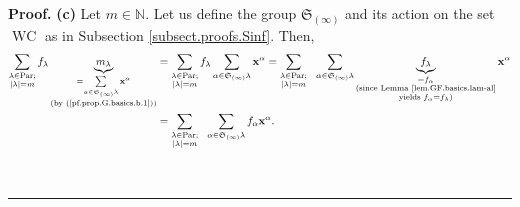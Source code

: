 \documentclass[numbers=enddot,12pt,final,onecolumn,notitlepage]{scrartcl}%
\theoremstyle{definition}
\newenvironment{proof}[1][Proof]{\noindent\textbf{#1.} }{\ \rule{0.5em}{0.5em}}
\let\sumnonlimits\sum
\renewcommand{\sum}{\sumnonlimits\limits}
\newenvironment{verlong}{}{}
\begin{document}
\begin{verlong}
\begin{proof}
\textbf{(c)} Let $m\in\mathbb{N}$. Let us define the group $\mathfrak{S}%
_{\left(  \infty\right)  }$ and its action on the set $\operatorname*{WC}$ as
in Subsection \ref{subsect.proofs.Sinf}. Then,%
\begin{align}
\sum_{\substack{\lambda\in\operatorname*{Par};\\\left\vert \lambda\right\vert
=m}}f_{\lambda}\underbrace{m_{\lambda}}_{\substack{=\sum_{\alpha
\in\mathfrak{S}_{\left(  \infty\right)  }\lambda}\mathbf{x}^{\alpha
}\\\text{(by (\ref{pf.prop.G.basics.b.1}))}}}  &  =\sum_{\substack{\lambda
\in\operatorname*{Par};\\\left\vert \lambda\right\vert =m}}f_{\lambda}%
\sum_{\alpha\in\mathfrak{S}_{\left(  \infty\right)  }\lambda}\mathbf{x}%
^{\alpha}=\sum_{\substack{\lambda\in\operatorname*{Par};\\\left\vert
\lambda\right\vert =m}}\ \ \sum_{\alpha\in\mathfrak{S}_{\left(  \infty\right)
}\lambda}\underbrace{f_{\lambda}}_{\substack{=f_{\alpha}\\\text{(since Lemma
\ref{lem.GF.basics.lam-al}}\\\text{yields }f_{\alpha}=f_{\lambda}\text{)}%
}}\mathbf{x}^{\alpha}\nonumber\\
&  =\sum_{\substack{\lambda\in\operatorname*{Par};\\\left\vert \lambda
\right\vert =m}}\ \ \sum_{\alpha\in\mathfrak{S}_{\left(  \infty\right)
}\lambda}f_{\alpha}\mathbf{x}^{\alpha}. \label{pf.prop.GF.basics.c.new1}%
\end{align}



\end{proof}
\end{verlong}
\end{document}
